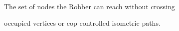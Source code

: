 \documentclass[preview]{standalone}
\begin{document}
\begin{center}
The set of nodes the Robber can reach without crossing\\occupied vertices or cop-controlled isometric paths.
\end{center}
\end{document}
